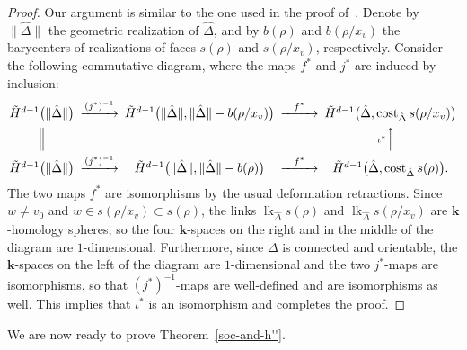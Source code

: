 \documentclass[10pt]{amsart}
\theoremstyle{definition}
\DeclareMathOperator\lk{lk}
\DeclareMathOperator\cost{cost}
\newcommand{\complet}[1]{\hat{#1}}
\newcommand{\field}{\mathbf{k}}
\begin{document}
\begin{proof}
Our argument is similar to the one used in the proof of~\cite[Theorem~2.1]{Novik-Swartz-09:Gorenstein}. Denote by $\|\complet{\Delta}\|$ the geometric realization of $\complet{\Delta}$, and by $b(\rho)$ and $b(\rho/x_v)$ the barycenters of realizations of faces $s(\rho)$ and $s(\rho/x_v)$, respectively. Consider the following commutative diagram, where the maps $f^\ast$ and $j^\ast$ are induced by inclusion:
\[
\begin{CD}
\tilde{H}^{d-1}\big(\|\complet{\Delta}\|\big) @>(j^\ast)^{-1}>> 
\tilde{H}^{d-1}\big(\|\complet{\Delta}\|, \|\complet{\Delta}\| - b(\rho/x_v)\big)
 @>f^\ast>> \tilde{H}^{d-1}\big(\complet{\Delta}, \cost_{\complet{\Delta}}s(\rho/x_v)\big) \\
 @| @. @A\iota^\ast AA \\
 \tilde{H}^{d-1}\big(\|\complet{\Delta}\|\big) @>(j^\ast)^{-1}>> 
\tilde{H}^{d-1}\big(\|\complet{\Delta}\|, \|\complet{\Delta}\| - b(\rho)\big) 
@>f^\ast>> \tilde{H}^{d-1}\big(\complet{\Delta}, \cost_{\complet{\Delta}}s(\rho)\big). 
\end{CD}
\]
The two maps $f^\ast$ are isomorphisms by the usual deformation retractions. Since $w\neq v_0$ and $w\in s(\rho/x_v) \subset s(\rho)$, the links $\lk_{\complet{\Delta}} s(\rho)$ and $\lk_{\complet{\Delta}} s(\rho/x_v)$ are $\field$-homology spheres, so the four $\field$-spaces on the right and in the middle of the diagram are $1$-dimensional. Furthermore, since $\Delta$ is connected and orientable, the $\field$-spaces on the left of the diagram are $1$-dimensional and the two $j^\ast$-maps are isomorphisms, so that $(j^\ast)^{-1}$-maps are well-defined and are isomorphisms as well. This implies that $\iota^\ast$ is an isomorphism and completes the proof.
\end{proof}

We are now ready to prove Theorem~\ref{soc-and-h''}.
\end{document}
